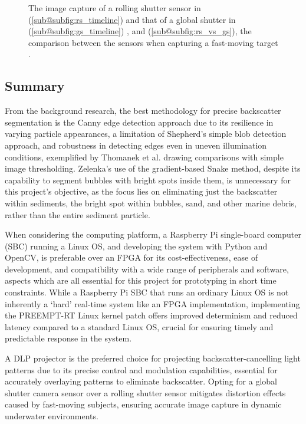 \begin{figure}[H]
\begin{subfigure}{0.45\textwidth}
        \caption{}
        \label{subfig:rs_vs_gs}
    \end{subfigure}
    \caption{The image capture of a rolling shutter sensor in (\ref{sub@subfig:rs_timeline}) and that of a global shutter in (\ref{sub@subfig:gs_timeline}) \cite{reddigitalcinemaGlobalRollingShutters}, and (\ref{sub@subfig:rs_vs_gs}), the comparison between the sensors when capturing a fast-moving target \cite{RollingShutterVs}.}
    \label{fig:rs_vs_gs}
\end{figure}

\subsection{Summary}
\label{bisummary}

From the background research, the best methodology for precise backscatter segmentation is the Canny edge detection approach due to its resilience in varying particle appearances, a limitation of Shepherd's simple blob detection approach, and robustness in detecting edges even in uneven illumination conditions, exemplified by Thomanek et al. drawing comparisons with simple image thresholding. Zelenka's use of the gradient-based Snake method, despite its capability to segment bubbles with bright spots inside them, is unnecessary for this project's objective, as the focus lies on eliminating just the backscatter within sediments, the bright spot within bubbles, sand, and other marine debris, rather than the entire sediment particle.

When considering the computing platform, a Raspberry Pi single-board computer (SBC) running a Linux OS, and developing the system with Python and OpenCV, is preferable over an FPGA for its cost-effectiveness, ease of development, and compatibility with a wide range of peripherals and software, aspects which are all essential for this project for prototyping in short time constraints. While a Raspberry Pi SBC that runs an ordinary Linux OS is not inherently a `hard' real-time system like an FPGA implementation, implementing the PREEMPT-RT Linux kernel patch offers improved determinism and reduced latency compared to a standard Linux OS, crucial for ensuring timely and predictable response in the system.

A DLP projector is the preferred choice for projecting backscatter-cancelling light patterns due to its precise control and modulation capabilities, essential for accurately overlaying patterns to eliminate backscatter. Opting for a global shutter camera sensor over a rolling shutter sensor mitigates distortion effects caused by fast-moving subjects, ensuring accurate image capture in dynamic underwater environments.
